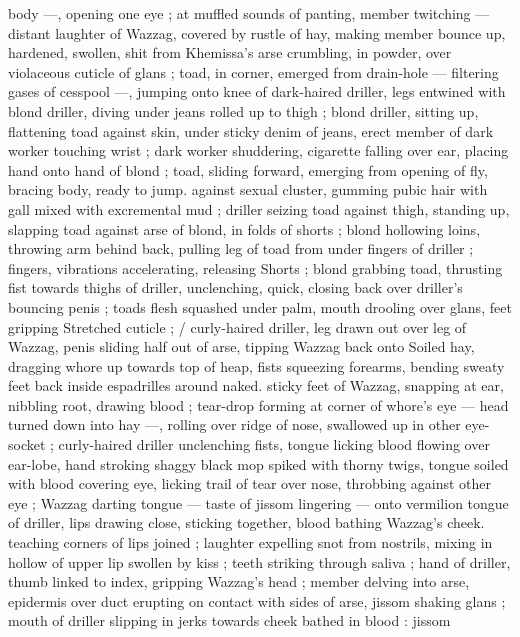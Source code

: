 body ---, opening one eye ; at muffled sounds of panting, member 
twitching --- distant laughter of Wazzag, covered by rustle of hay, 
making member bounce up, hardened, swollen, shit from Khemissa's 
arse crumbling, in powder, over violaceous cuticle of glans ; toad, in 
corner, emerged from drain-hole --- filtering gases of cesspool ---, 
jumping onto knee of dark-haired driller, legs entwined with blond 
driller, diving under jeans rolled up to thigh ; blond driller, sitting up, 
flattening toad against skin, under sticky denim of jeans, erect 
member of dark worker touching wrist ; dark worker shuddering, 
cigarette falling over ear, placing hand onto hand of blond ; toad, 
sliding forward, emerging from opening of fly, bracing body, ready to 
jump. against sexual cluster, gumming pubic hair with gall mixed with 
excremental mud ; driller seizing toad against thigh, standing up, 
slapping toad against arse of blond, in folds of shorts ; blond 
hollowing loins, throwing arm behind back, pulling leg of toad from 
under fingers of driller ; fingers, vibrations accelerating, releasing 
Shorts ; blond grabbing toad, thrusting fist towards thighs of driller, 
unclenching, quick, closing back over driller's bouncing penis ; toads 
flesh squashed under palm, mouth drooling over glans, feet gripping 
Stretched cuticle ; {\slash} curly-haired driller, leg drawn out over leg of 
Wazzag, penis sliding half out of arse, tipping Wazzag back onto 
Soiled hay, dragging whore up towards top of heap, fists squeezing 
forearms, bending sweaty feet back inside espadrilles around naked. 
sticky feet of Wazzag, snapping at ear, nibbling root, drawing blood 
; tear-drop forming at corner of whore's eye --- head turned down 
into hay ---, rolling over ridge of nose, swallowed up in other eye- 
socket ; curly-haired driller unclenching fists, tongue licking blood 
flowing over ear-lobe, hand stroking shaggy black mop spiked with 
thorny twigs, tongue soiled with blood covering eye, licking trail of 
tear over nose, throbbing against other eye ; Wazzag darting tongue 
--- taste of jissom lingering --- onto vermilion tongue of driller, lips 
drawing close, sticking together, blood bathing Wazzag's cheek. 
teaching corners of lips joined ; laughter expelling snot from 
nostrils, mixing in hollow of upper lip swollen by kiss ; teeth striking 
through saliva ; hand of driller, thumb linked to index, gripping 
Wazzag's head ; member delving into arse, epidermis over duct 
erupting on contact with sides of arse, jissom shaking glans ; mouth 
of driller slipping in jerks towards cheek bathed in blood : jissom 
